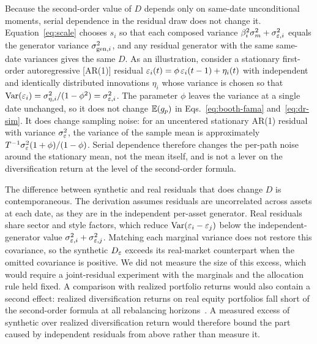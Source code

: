 Because the second-order value of $D$ depends only on same-date
unconditional moments, serial dependence in the residual draw does not
change it. Equation~\eqref{eq:scale} chooses $s_i$ so that each
composed variance $\beta_i^2\sigma_m^2+\sigma_{\varepsilon,i}^2$ equals the
generator variance $\sigma_{\mathrm{gen},i}^2$, and any residual generator
with the same same-date variances gives the same $D$. As an
illustration, consider a stationary first-order autoregressive
[AR(1)] residual $\varepsilon_i(t) = \phi\, \varepsilon_i(t-1) + \eta_i(t)$ with
independent and identically distributed innovations $\eta_i$ whose
variance is chosen so that
$\operatorname{Var}(\varepsilon_i) = \sigma_{\eta,i}^2 / (1 - \phi^2) = \sigma_{\varepsilon,i}^2$.
The parameter $\phi$ leaves the variance at a single date unchanged,
so it does not change $\mathbb{E}(g_p)$ in Eqs.~\eqref{eq:booth-fama}
and~\eqref{eq:dr-sim}. It does change sampling noise: for an
uncentered stationary AR(1) residual with variance $\sigma_\varepsilon^2$,
the variance of the sample mean is approximately
$T^{-1}\sigma_\varepsilon^2(1+\phi)/(1-\phi)$. Serial dependence therefore
changes the per-path noise around the stationary mean, not the mean
itself, and is not a lever on the diversification return at the level
of the second-order formula.

The difference between synthetic and real residuals that does change
$D$ is contemporaneous. The derivation assumes residuals are
uncorrelated across assets at each date, as they are in the
independent per-asset generator. Real residuals share sector and style
factors, which reduce $\operatorname{Var}(\varepsilon_i-\varepsilon_j)$ below the
independent-generator value $\sigma_{\varepsilon,i}^2+\sigma_{\varepsilon,j}^2$.
Matching each marginal variance does not restore this covariance, so
the synthetic $D_\varepsilon$ exceeds its real-market counterpart when the
omitted covariance is positive. We did not measure the size of this
excess, which would require a joint-residual experiment with the
marginals and the allocation rule held fixed. A comparison with
realized portfolio returns would also contain a second effect:
realized diversification returns on real equity portfolios fall short
of the second-order formula at all rebalancing
horizons~\cite{boucheyNemtchinovWong2015}. A measured excess of
synthetic over realized diversification return would therefore bound
the part caused by independent residuals from above rather than
measure it.



